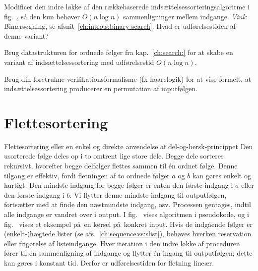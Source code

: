 \begin{exerc}
  Modificer den indre løkke af den rækkebaserede indsættelsessorteringsalgoritme i fig.~, så den kun behøver $O(n\log n)$ sammenligninger mellem indgange. 
  \emph{Vink}: Binærsøgning, se afsnit~\ref{ch:intro:s:binary search}.
  Hvad er udførelsestiden af denne variant?    
\end{exerc}

\begin{exerc}
  Brug datastrukturen for ordnede følger fra kap.~\ref{ch:search:} for at skabe en variant af indsættelsessortering med udførelsestid $O(n\log n)$. 
\end{exerc}

\begin{exerc}
  Brug din foretrukne verifikationsformalisme (fx hoarelogik) for at vise formelt, at indsættelsessortering producerer en permutation af inputfølgen.
\end{exerc}

\section{Flettesortering}
%
%
%

Flettesortering eller en enkel og direkte anvendelse af del-og-hersk-princippet
Den usorterede følge deles op i to omtrent lige store dele.
Begge dele sorteres rekursivt, hvorefter begge delfølger flettes sammen til én ordnet følge.
Denne tilgang er effektiv, fordi fletningen af to ordnede følger $a$ og $b$ kan gøres enkelt og hurtigt.
Den mindste indgang for begge følger er enten den første indgang i $a$ eller den første indgang i $b$.
Vi flytter denne mindste indgang til output\-følgen, fortsætter med at finde den næstmindste indgang, osv.
Processen gentages, indtil alle indgange er vandret over i output.
I fig.~ vises algoritmen i pseudokode, og i fig.~ vises et eksempel på en kørsel på konkret input.
Hvis de indgående følger er (enkelt-)hægtede lister (se afs.~\ref{ch:sequence:ss:slist}), behøves hverken reservation eller frigørelse af listeindgange.
Hver iteration i den indre løkke af proceduren  fører til én sammenligning af indgange og flytter én ingang til outputfølgen; dette kan gøres i konstant tid.
Derfor er udførelsestiden for fletning lineær.

